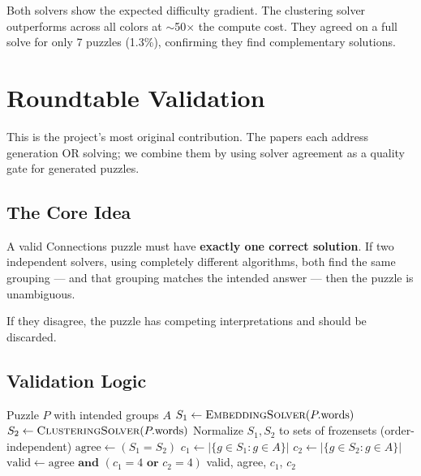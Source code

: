 \documentclass[11pt, letterpaper]{article}
\begin{document}
Both solvers show the expected difficulty gradient. The clustering solver outperforms across all colors at $\sim$50$\times$ the compute cost. They agreed on a full solve for only 7 puzzles (1.3\%), confirming they find complementary solutions.

\section{Roundtable Validation}

\begin{keyidea}
This is the project's most original contribution. The papers each address generation OR solving; we combine them by using solver agreement as a quality gate for generated puzzles.
\end{keyidea}

\subsection{The Core Idea}

A valid Connections puzzle must have \textbf{exactly one correct solution}. If two independent solvers, using completely different algorithms, both find the same grouping --- and that grouping matches the intended answer --- then the puzzle is unambiguous.

If they disagree, the puzzle has competing interpretations and should be discarded.

\subsection{Validation Logic}

\begin{algorithm}[H]
\caption{Roundtable Validation}
\begin{algorithmic}[1]
\Require Puzzle $P$ with intended groups $A$
\State $S_1 \gets \textsc{EmbeddingSolver}(P.\text{words})$
\State $S_2 \gets \textsc{ClusteringSolver}(P.\text{words})$
\State Normalize $S_1, S_2$ to sets of frozensets (order-independent)
\State $\text{agree} \gets (S_1 = S_2)$ 
\State $c_1 \gets |\{g \in S_1 : g \in A\}|$ 
\State $c_2 \gets |\{g \in S_2 : g \in A\}|$
\State $\text{valid} \gets \text{agree} \textbf{ and } (c_1 = 4 \textbf{ or } c_2 = 4)$
\State \Return valid, agree, $c_1$, $c_2$
\end{algorithmic}
\end{algorithm}
\end{document}
